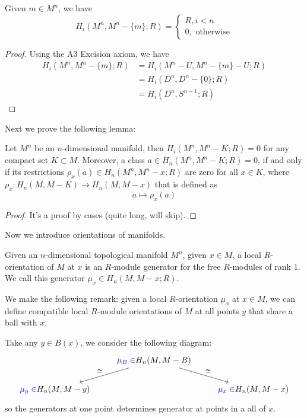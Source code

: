 \begin{prop}
    Given $m\in M^n$, we have 
    \begin{equation*}
        H_i(M^n, M^n-\{m\};R)=\begin{cases}
            R, i<n\\
            0, \text{ otherwise}
        \end{cases}
    \end{equation*}
\end{prop}
\begin{proof}
    Using the A3 Excision axiom, we have 
    \begin{align*}
        H_i(M^n, M^n-\{m\};R)&=H_i(M^n-U, M^n-\{m\}-U;R)\\
        &=H_i(D^n, D^n-\{0\};R)\\
        &=H_i(D^n,S^{n-1};R)
    \end{align*}
\end{proof}
Next we prove the following lemma:
\begin{lem}
    Let $M^n$ be an $n$-dimensional manifold, then $H_i(M^n, M^n-K;R)=0$ for any compact set $K\subset M$. Moreover, a class $a\in H_n(M^n,M^n-K;R)=0$, if and only if its restrictions $\rho_x(a)\in H_n(M^n, M^n-x;R)$ are zero for all $x\in K$, where $\rho_x:H_n(M,M-K)\to H_n(M,M-x)$ that is defined as
    \begin{equation*}
        a\mapsto \rho_x(a)
    \end{equation*}
\end{lem}
\begin{proof}
    It's a proof by cases (quite long, will skip).
\end{proof}

Now we introduce orientations of manifolds.
\begin{defn}[$R$-orientation]
    Given an $n$-dimensional topological manifold $M^n$, given $x\in M$, a local $R$-orientation of $M$ at $x$ is an $R$-module generator for the free $R$-modules of rank $1$. We call this generator $\mu_x\in H_n(M,M-x;R)$. 
\end{defn}
We make the following remark: given a local $R$-orientation $\mu_x$ at $x\in M$, we can define compatible local $R$-module orientations of $M$ at all points $y$ that share a ball with $x$.

Take any $y\in B(x)$, we consider the following diagram:
\[\begin{tikzcd}
	& {\textcolor{blue}{\mu_B\in}H_n(M,M-B)} \\
	{\textcolor{blue}{\mu_y\in}H_n(M,M-y)} && {\textcolor{blue}{\mu_x\in}H_n(M,M-x)}
	\arrow["\cong"', from=1-2, to=2-1]
	\arrow["\cong", from=1-2, to=2-3]
\end{tikzcd}\]
so the generators at one point determines generator at points in a all of $x$.

